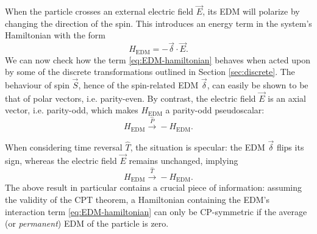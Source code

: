 When the particle crosses an external electric field $\vec{E}$, its EDM will polarize by changing the direction of the spin. This introduces an energy term in the system's Hamiltonian with the form
\begin{equation}
H_\text{EDM} = - \vec{\delta} \cdot \vec{E} .
\label{eq:EDM-hamiltonian}
\end{equation}
We can now check how the term \eqref{eq:EDM-hamiltonian} behaves when acted upon by some of the discrete transformations outlined in Section \ref{sec:discrete}.
The behaviour of spin $\vec{S}$,
hence of the spin-related EDM $\vec{\delta}$, can easily be shown to be 
that of polar vectors, i.e. parity-even.
By contrast, the electric field $\vec{E}$ is an axial vector, i.e. parity-odd, which makes $H_\text{EDM}$ a parity-odd pseudoscalar:
\begin{equation}
H_\text{EDM} \xrightarrow{\hat{P}} - H_\text{EDM}.
\label{eq:EDM-hamiltonian-under-P}
\end{equation}

When considering time reversal $\hat{T}$, the situation is specular:
the EDM $\vec{\delta}$ flips its sign, whereas the electric field $\vec{E}$ remains unchanged, implying
\begin{equation}
H_\text{EDM} \xrightarrow{\hat{T}} - H_\text{EDM}.
\label{eq:EDM-hamiltonian-under-T}
\end{equation}
The above result in particular contains a crucial piece of information:
assuming the validity of the CPT theorem, a Hamiltonian containing the EDM's interaction term \eqref{eq:EDM-hamiltonian} can only be CP-symmetric if the average (or \textit{permanent}) EDM of the particle is zero.

